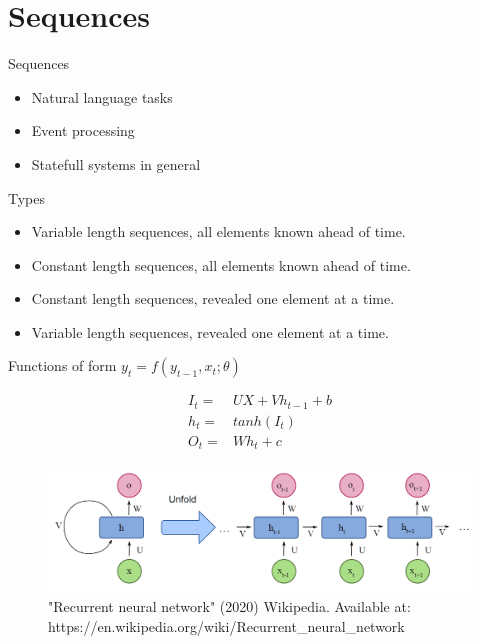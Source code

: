 \section{Sequences}

\begin{frame}{Sequences} 
			\begin{itemize}
				\item Natural language tasks 
				\item Event processing  
				\item Statefull systems in general
			\end{itemize}	
		\begin{block}{Types}
			\begin{itemize}
				\item Variable length sequences, all elements known ahead of time. 
				\item Constant length sequences, all elements known ahead of time. 
				\item Constant length sequences, revealed one element at a time.
				\item Variable length sequences, revealed one element at a time.
			\end{itemize}
		\end{block}

\end{frame}

\begin{frame}{Functions of form $y_t = f(y_{t-1}, x_t; \theta)$}

\begin{eqnarray}
I_t =& UX+Vh_{t-1}+b \\
h_t =& tanh(I_t) \\
O_t =& Wh_t + c 
\end{eqnarray}

\begin{center}
\begin{figure}
	\includegraphics[width=.8\textwidth]{figures/rnn_wikipedia_1}
	\caption*{\tiny{"Recurrent neural network" (2020) Wikipedia. Available at:
	https://en.wikipedia.org/wiki/Recurrent\_neural\_network}}
\end{figure}
\end{center}
\end{frame}

